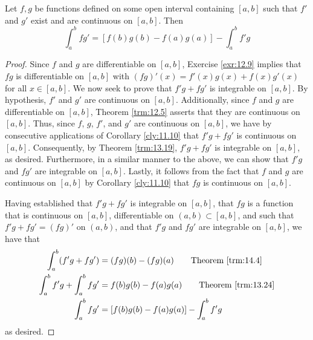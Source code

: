\documentclass[../main.tex]{subfiles}
\begin{document}
\begin{corollary}\label{cly:14.5}
    Let $f,g$ be functions defined on some open interval containing $[a,b]$ such that $f'$ and $g'$ exist and are continuous on $[a,b]$. Then
    \begin{equation*}
        \int_a^bfg' = [f(b)g(b)-f(a)g(a)]-\int_a^bf'g
    \end{equation*}
    \begin{proof}
        Since $f$ and $g$ are differentiable on $[a,b]$, Exercise \ref{exr:12.9} implies that $fg$ is differentiable on $[a,b]$ with $(fg)'(x)=f'(x)g(x)+f(x)g'(x)$ for all $x\in[a,b]$. We now seek to prove that $f'g+fg'$ is integrable on $[a,b]$. By hypothesis, $f'$ and $g'$ are continuous on $[a,b]$. Additionally, since $f$ and $g$ are differentiable on $[a,b]$, Theorem \ref{trm:12.5} asserts that they are continuous on $[a,b]$. Thus, since $f$, $g$, $f'$, and $g'$ are continuous on $[a,b]$, we have by consecutive applications of Corollary \ref{cly:11.10} that $f'g+fg'$ is continuous on $[a,b]$. Consequently, by Theorem \ref{trm:13.19}, $f'g+fg'$ is integrable on $[a,b]$, as desired. Furthermore, in a similar manner to the above, we can show that $f'g$ and $fg'$ are integrable on $[a,b]$. Lastly, it follows from the fact that $f$ and $g$ are continuous on $[a,b]$ by Corollary \ref{cly:11.10} that $fg$ is continuous on $[a,b]$.\par
        Having established that $f'g+fg'$ is integrable on $[a,b]$, that $fg$ is a function that is continuous on $[a,b]$, differentiable on $(a,b)\subset[a,b]$, and such that $f'g+fg'=(fg)'$ on $(a,b)$, and that $f'g$ and $fg'$ are integrable on $[a,b]$, we have that
        \begin{align*}
            \int_a^b(f'g+fg') &= (fg)(b)-(fg)(a)\tag*{Theorem \ref{trm:14.4}}\\
            \int_a^bf'g+\int_a^bfg' &= f(b)g(b)-f(a)g(a)\tag*{Theorem \ref{trm:13.24}}\\
            \int_a^bfg' &= [f(b)g(b)-f(a)g(a)]-\int_a^bf'g
        \end{align*}
        as desired.
    \end{proof}
\end{corollary}
\end{document}
